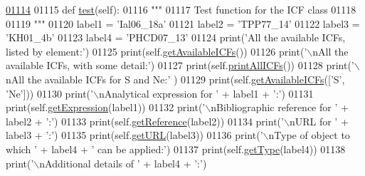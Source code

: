 \begin{DoxyCode}
\hypertarget{classpyneb_1_1core_1_1icf_1_1_i_c_f_l01114}{}\hyperlink{classpyneb_1_1core_1_1icf_1_1_i_c_f_a3f8b36c58faee2f30bbb12d761451a77}{01114} 
01115     \textcolor{keyword}{def }\hyperlink{classpyneb_1_1core_1_1icf_1_1_i_c_f_a3f8b36c58faee2f30bbb12d761451a77}{test}(self):
01116         \textcolor{stringliteral}{""" }
01117 \textcolor{stringliteral}{        Test function for the ICF class }
01118 \textcolor{stringliteral}{}
01119 \textcolor{stringliteral}{        """}
01120         label1 = \textcolor{stringliteral}{'Ial06\_18a'}
01121         label2 = \textcolor{stringliteral}{'TPP77\_14'}
01122         label3 = \textcolor{stringliteral}{'KH01\_4b'}
01123         label4 = \textcolor{stringliteral}{'PHCD07\_13'}
01124         print(\textcolor{stringliteral}{'All the available ICFs, listed by element:'})
01125         print(self.\hyperlink{classpyneb_1_1core_1_1icf_1_1_i_c_f_a4cacc6d494ce482990e513f4cf728e30}{getAvailableICFs}())
01126         print(\textcolor{stringliteral}{'\(\backslash\)nAll the available ICFs, with some detail:'})
01127         print(self.\hyperlink{classpyneb_1_1core_1_1icf_1_1_i_c_f_a49885ca930ec64edb2a9e972585cbb37}{printAllICFs}())
01128         print(\textcolor{stringliteral}{'\(\backslash\)nAll the available ICFs for S and Ne:'} )  
01129         print(self.\hyperlink{classpyneb_1_1core_1_1icf_1_1_i_c_f_a4cacc6d494ce482990e513f4cf728e30}{getAvailableICFs}([\textcolor{stringliteral}{'S'}, \textcolor{stringliteral}{'Ne'}]))
01130         print(\textcolor{stringliteral}{'\(\backslash\)nAnalytical expression for '} + label1 + \textcolor{stringliteral}{':'})
01131         print(self.\hyperlink{classpyneb_1_1core_1_1icf_1_1_i_c_f_ad9e5250afc13ea42c6eedbc1bc0b860c}{getExpression}(label1))
01132         print(\textcolor{stringliteral}{'\(\backslash\)nBibliographic reference for '} + label2 + \textcolor{stringliteral}{':'})
01133         print(self.\hyperlink{classpyneb_1_1core_1_1icf_1_1_i_c_f_a90b32c028a9e441aa3a80a215a4be58c}{getReference}(label2))
01134         print(\textcolor{stringliteral}{'\(\backslash\)nURL for '} + label3 + \textcolor{stringliteral}{':'})
01135         print(self.\hyperlink{classpyneb_1_1core_1_1icf_1_1_i_c_f_af27cec8e87d89720ee65fba6e28c2d9e}{getURL}(label3))
01136         print(\textcolor{stringliteral}{'\(\backslash\)nType of object to which '} + label4 + \textcolor{stringliteral}{' can be applied:'})
01137         print(self.\hyperlink{classpyneb_1_1core_1_1icf_1_1_i_c_f_a96c632a868e90cdd20ba7a091aa73207}{getType}(label4))
01138         print(\textcolor{stringliteral}{'\(\backslash\)nAdditional details of '} + label4 + \textcolor{stringliteral}{':'})

\end{DoxyCode}
